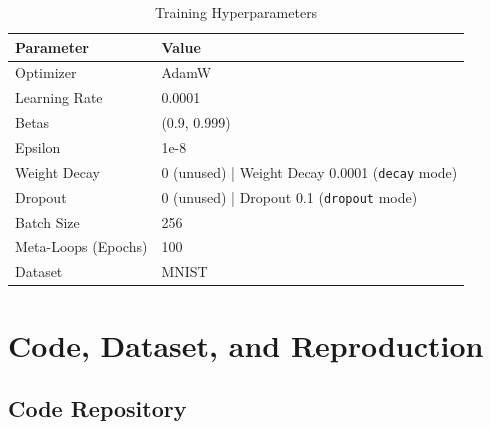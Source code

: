 \documentclass[conference]{IEEEtran}
\begin{document}
\twocolumn

\FloatBarrier
\begin{table}[h]
\centering
\caption{Training Hyperparameters}
\label{tab:hyperparameters}
\begin{tabular}{ll}
\toprule
\textbf{Parameter} & \textbf{Value} \\
\midrule
Optimizer & AdamW \\
Learning Rate & 0.0001 \\
Betas & (0.9, 0.999) \\
Epsilon & 1e-8 \\
Weight Decay & 0 (unused) | Weight Decay 0.0001 (\verb|decay| mode)\\
Dropout & 0 (unused) | Dropout 0.1 (\verb|dropout| mode)\\
Batch Size & 256 \\
Meta-Loops (Epochs) & 100 \\
Dataset & MNIST \\
\bottomrule
\end{tabular}
\end{table}

\section*{Code, Dataset, and Reproduction}

\subsection*{Code Repository}
\end{document}
